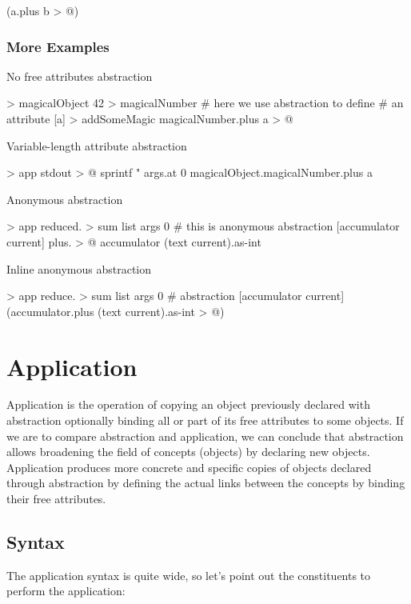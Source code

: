 \documentclass[12pt]{book}
\begin{document}
\begin{ffcode}
[a b] (a.plus b > @)
\end{ffcode}

\subsubsection{More Examples}

No free attributes abstraction
\begin{ffcode}
[] > magicalObject
  42 > magicalNumber
  # here we use abstraction to define 
  # an attribute
  [a] > addSomeMagic
    magicalNumber.plus a > @
\end{ffcode}
Variable-length attribute abstraction
\begin{ffcode}
[args...] > app
  stdout > @
    sprintf
      "\n%
      args.at 0
      magicalObject.magicalNumber.plus a
\end{ffcode}
Anonymous abstraction
\begin{ffcode}
[args...] > app
  reduced. > sum
    list args
    0
    # this is anonymous abstraction
    [accumulator current]
      plus. > @
        accumulator
        (text current).as-int
\end{ffcode}
Inline anonymous abstraction
\begin{ffcode}
[args...] > app
  reduce. > sum
    list args
    0
    # abstraction
    [accumulator current] (accumulator.plus (text current).as-int > @)
\end{ffcode}

\section{Application} \label{sec:application}
Application is the operation of copying an object previously declared with abstraction optionally binding all or part of its free attributes to some objects.
If we are to compare abstraction and application, we can conclude that abstraction allows broadening the field of concepts (objects) by declaring new objects. Application produces more concrete and specific copies of objects declared through abstraction by defining the actual links between the concepts by binding their free attributes.

\subsection{Syntax}
The application syntax is quite wide, so let's point out the constituents to perform the application:
\end{document}
